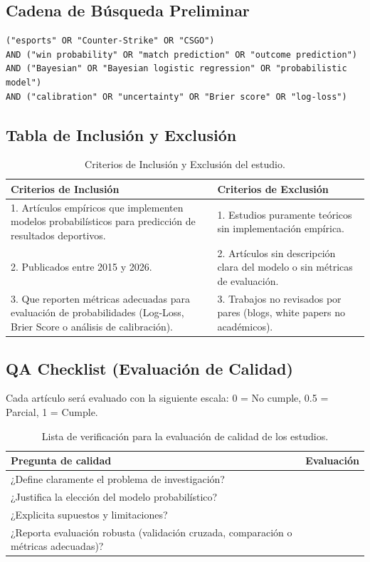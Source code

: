 \documentclass{article}
\begin{document}
\subsection{Cadena de Búsqueda Preliminar}

\begin{verbatim}
("esports" OR "Counter-Strike" OR "CSGO")
AND ("win probability" OR "match prediction" OR "outcome prediction")
AND ("Bayesian" OR "Bayesian logistic regression" OR "probabilistic model")
AND ("calibration" OR "uncertainty" OR "Brier score" OR "log-loss")
\end{verbatim}

\subsection{Tabla de Inclusión y Exclusión}

\begin{table}[H]
\centering
\begin{tabular}{|p{7.5cm}|p{7.5cm}|}
\hline
\textbf{Criterios de Inclusión} & \textbf{Criterios de Exclusión} \\
\hline
1. Artículos empíricos que implementen modelos probabilísticos para predicción de resultados deportivos. & 1. Estudios puramente teóricos sin implementación empírica. \\
\hline
2. Publicados entre 2015 y 2026. & 2. Artículos sin descripción clara del modelo o sin métricas de evaluación. \\
\hline
3. Que reporten métricas adecuadas para evaluación de probabilidades (Log-Loss, Brier Score o análisis de calibración). & 3. Trabajos no revisados por pares (blogs, white papers no académicos). \\
\hline
\end{tabular}
\caption{Criterios de Inclusión y Exclusión del estudio.}
\label{tab:criterios}
\end{table}


\subsection{QA Checklist (Evaluación de Calidad)}

Cada artículo será evaluado con la siguiente escala:  
0 = No cumple, 0.5 = Parcial, 1 = Cumple.

\begin{table}[H]
\centering
\begin{tabular}{|p{11cm}|c|}
\hline
\textbf{Pregunta de calidad} & \textbf{Evaluación} \\
\hline
¿Define claramente el problema de investigación? &  \\
\hline
¿Justifica la elección del modelo probabilístico? &  \\
\hline
¿Explicita supuestos y limitaciones? &  \\
\hline
¿Reporta evaluación robusta (validación cruzada, comparación o métricas adecuadas)? &  \\
\hline
\end{tabular}
\caption{Lista de verificación para la evaluación de calidad de los estudios.}
\label{tab:qa}
\end{table}
\end{document}
